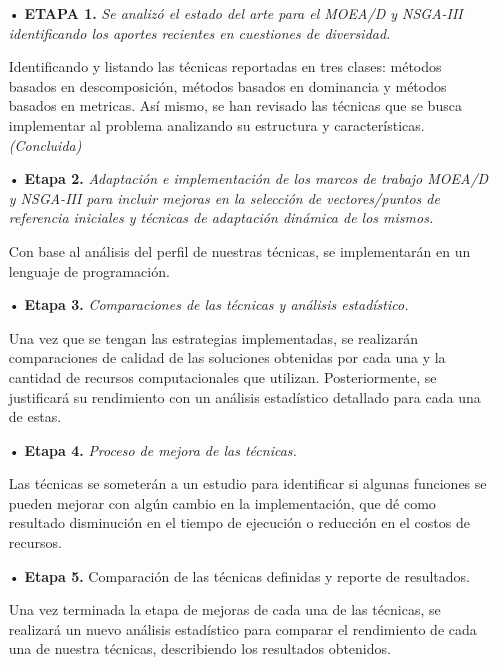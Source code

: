 \documentclass[letterpaper,10pt]{article}
\begin{document}
 \begin{itemize}
 \item[•] \textbf{ETAPA 1.} \emph{Se analizó el estado del arte para el MOEA/D y NSGA-III identificando los aportes recientes en cuestiones de diversidad.}
\item[] Identificando y listando las técnicas reportadas en tres clases: métodos basados en descomposición, métodos basados en dominancia y métodos basados en metricas. Así mismo, se han revisado las técnicas que se busca implementar al problema analizando su estructura y características.
\emph{(Concluida)}

\item[•] \textbf{Etapa 2.} \emph{Adaptación e implementación de los marcos de trabajo MOEA/D y NSGA-III para incluir mejoras en la selección de vectores/puntos de referencia iniciales y técnicas de adaptación dinámica de los mismos.}

\item[] Con base al análisis del perfil de nuestras técnicas, se implementarán en un lenguaje de programación.
        
\item[•] \textbf{Etapa 3.} \emph{Comparaciones de las técnicas y análisis estadístico.}

\item [] Una vez que se tengan las estrategias implementadas, se realizarán comparaciones de calidad de las soluciones obtenidas por cada una y la cantidad de recursos computacionales  que utilizan. Posteriormente, se justificará su rendimiento con un análisis estadístico detallado para cada  una de estas.

\item[•] \textbf{Etapa 4.} \emph{Proceso de mejora de las técnicas.}

\item[] Las técnicas se someterán a un estudio para identificar si algunas funciones se pueden mejorar con algún cambio en la implementación, que dé como resultado disminución en el tiempo de ejecución o reducción en el costos de recursos.


\item[•] \textbf{Etapa 5.} Comparación de las técnicas definidas y reporte de resultados.

\item[] Una vez terminada la etapa de mejoras de cada una de las técnicas, se realizará un nuevo análisis estadístico para comparar el rendimiento de cada una de nuestra técnicas, describiendo los resultados obtenidos.
        
  \end{itemize}
\end{document}
